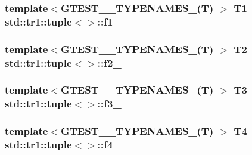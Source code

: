 \subsubsection[{\texorpdfstring{f1\+\_\+}{f1_}}]{\setlength{\rightskip}{0pt plus 5cm}template$<$G\+T\+E\+S\+T\+\_\+\_\+\+T\+Y\+P\+E\+N\+A\+M\+E\+S\+\_\+(\+T) $>$ T1 {\bf std\+::tr1\+::tuple}$<$$>$\+::f1\+\_\+}\hypertarget{classstd_1_1tr1_1_1tuple_a7cccf899dedc626c51fa4f6921d0ac52}{}\label{classstd_1_1tr1_1_1tuple_a7cccf899dedc626c51fa4f6921d0ac52}
\subsubsection[{\texorpdfstring{f2\+\_\+}{f2_}}]{\setlength{\rightskip}{0pt plus 5cm}template$<$G\+T\+E\+S\+T\+\_\+\_\+\+T\+Y\+P\+E\+N\+A\+M\+E\+S\+\_\+(\+T) $>$ T2 {\bf std\+::tr1\+::tuple}$<$$>$\+::f2\+\_\+}\hypertarget{classstd_1_1tr1_1_1tuple_aaec06c27366502dc332ef96878628f84}{}\label{classstd_1_1tr1_1_1tuple_aaec06c27366502dc332ef96878628f84}
\subsubsection[{\texorpdfstring{f3\+\_\+}{f3_}}]{\setlength{\rightskip}{0pt plus 5cm}template$<$G\+T\+E\+S\+T\+\_\+\_\+\+T\+Y\+P\+E\+N\+A\+M\+E\+S\+\_\+(\+T) $>$ T3 {\bf std\+::tr1\+::tuple}$<$$>$\+::f3\+\_\+}\hypertarget{classstd_1_1tr1_1_1tuple_ad4d3673e0d5c07c392c02e335fe978ff}{}\label{classstd_1_1tr1_1_1tuple_ad4d3673e0d5c07c392c02e335fe978ff}
\subsubsection[{\texorpdfstring{f4\+\_\+}{f4_}}]{\setlength{\rightskip}{0pt plus 5cm}template$<$G\+T\+E\+S\+T\+\_\+\_\+\+T\+Y\+P\+E\+N\+A\+M\+E\+S\+\_\+(\+T) $>$ T4 {\bf std\+::tr1\+::tuple}$<$$>$\+::f4\+\_\+}\hypertarget{classstd_1_1tr1_1_1tuple_ab662f1051c2302d065796383848db6c4}{}\label{classstd_1_1tr1_1_1tuple_ab662f1051c2302d065796383848db6c4}
